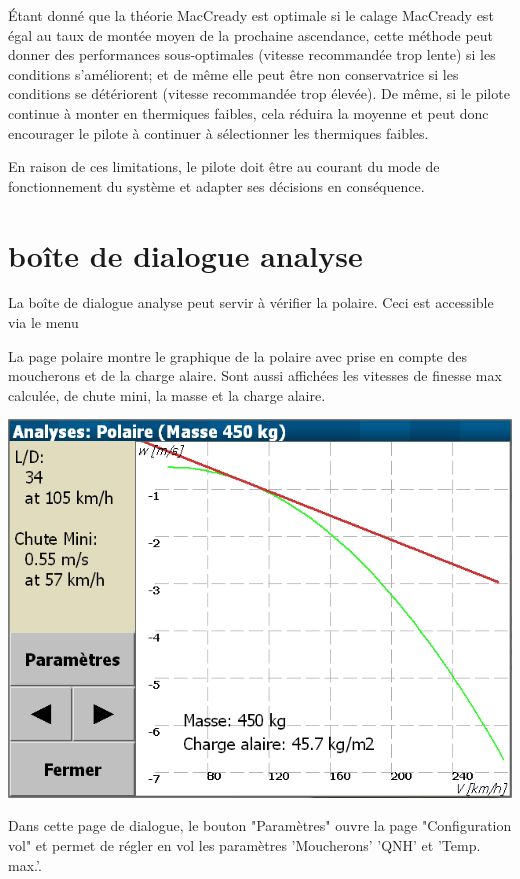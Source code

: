 Étant donné que la théorie MacCready est optimale si le calage MacCready est égal au taux de montée moyen de la prochaine ascendance, cette méthode peut donner des performances sous-optimales (vitesse recommandée trop lente) si les conditions s'améliorent; et de même elle peut être non conservatrice si les conditions se détériorent (vitesse recommandée trop élevée).  De même, si le pilote continue à monter en thermiques faibles, cela réduira la moyenne et peut donc encourager le pilote à continuer à sélectionner les thermiques faibles.

En raison de ces limitations, le pilote doit être au courant du mode de fonctionnement du système et adapter ses décisions en conséquence.

\section{boîte de dialogue analyse}

La boîte de dialogue analyse peut servir à vérifier la polaire.  Ceci est accessible via le menu
\begin{quote}
\blink{}
\end{quote}

La page polaire montre le graphique de la polaire avec prise en compte des moucherons et de la charge alaire. Sont aussi affichées les vitesses de finesse max calculée, de chute mini, la masse et la charge alaire.

\begin{center}
\includegraphics[angle=0,width=0.8\linewidth,keepaspectratio='true']{figures/analysis-glidepolar.png}
\end{center}

Dans cette page de dialogue, le bouton "Paramètres" ouvre la page "Configuration vol" et permet de régler en vol les paramètres 'Moucherons' 'QNH' et 'Temp. max.'.

